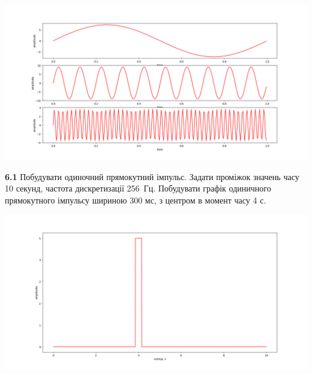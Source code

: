 \documentclass[a4paper,12pt]{article}
\begin{document}
\begin{center}
\includegraphics[height = 11.5 cm,width=13 cm]{5.png}
\end{center}
\begin{center}
\textbf{}\par
\end{center}

\textbf{6.1} Побудувати одиночний прямокутний імпульс. Задати проміжок значень часу 10 секунд, частота дискретизації 256 Гц. Побудувати графік одиничного прямокутного імпульсу шириною 300 мс, з центром в момент часу 4 с.\par



\begin{center}
\includegraphics[height = 11.5 cm,width=15 cm]{6.1.png}
\end{center}
\end{document}
